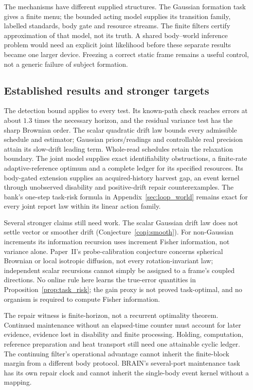 \documentclass[12pt]{article}
\theoremstyle{definition}
\begin{document}
The mechanisms have different supplied structures.
The Gaussian formation task gives a finite menu; the bounded acting
model supplies its transition family, labelled standards, body gate
and resource streams. The finite filters certify approximation of
that model, not its truth.
A shared body--world inference problem would need an explicit joint
likelihood before these separate results became one larger device.
Freezing a correct static frame remains a useful control, not a
generic failure of subject formation.

\subsection{Established results and stronger targets}
\label{subsec:claims}

The detection bound applies to every test. Its known-path check reaches
errors at about $1.3$ times the necessary horizon, and the residual
variance test has the sharp Brownian order.
The scalar quadratic drift law bounds every admissible schedule and
estimator; Gaussian priors/readings and controllable real precision
attain its slow-drift leading term.
Whole-read schedules retain the relaxation boundary.
The joint model supplies exact identifiability obstructions, a
finite-rate adaptive-reference optimum and a complete ledger for its
specified resources. Its body-gated extension supplies an acquired-history
harvest gap, an event kernel through unobserved disability and
positive-drift repair counterexamples.
The bank's one-step task-risk formula in
Appendix~\ref{sec:loop_world} remains exact for every joint report law
within its linear action family.

Several stronger claims still need work.
The scalar Gaussian drift law does not settle vector or smoother
drift (Conjecture~\ref{conj:smooth}).
For non-Gaussian increments its information recursion uses increment
Fisher information, not variance alone.
Paper~II's probe-calibration conjecture concerns spherical Brownian
or local isotropic diffusion, not every rotation-invariant law;
independent scalar recursions cannot simply be assigned to a frame's
coupled directions.
No online rule here learns the true-error quantities in
Proposition~\ref{prop:task_risk}; the gain proxy is not proved
task-optimal, and no organism is required to compute Fisher information.

The repair witness is finite-horizon, not a recurrent optimality theorem.
Continued maintenance without an elapsed-time counter must account
for later evidence, evidence lost in disability and finite processing.
Holding, computation, reference preparation and heat transport still
need one attainable cyclic ledger.
The continuing filter's operational advantage cannot inherit the
finite-block margin from a different body protocol.
BRAIN's several-port maintenance task~\cite{Liu2026BRAIN} has its own
repair clock and cannot inherit the single-body event kernel without
a mapping.
\end{document}
